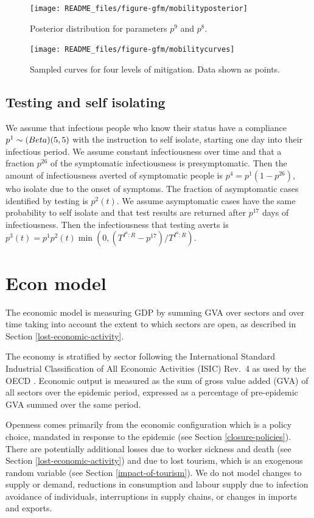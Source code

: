 \documentclass[
]{article}
\begin{document}
\begin{figure}
\texttt{[image: README\_files/figure-gfm/mobilityposterior]} \caption{Posterior distribution for parameters $p^9$ and $p^8$.}\label{fig:mobilityposterior}
\end{figure}

\begin{figure}
\texttt{[image: README\_files/figure-gfm/mobilitycurves]} \caption{Sampled curves for four levels of mitigation. Data shown as points.}\label{fig:mobilitycurves}
\end{figure}

\subsection{Testing and self isolating}\label{testing-and-self-isolating}

We assume that infectious people who know their status have a compliance \(p^1\sim\text(Beta)(5,5)\) with the instruction to self isolate, starting one day into their infectious period. We assume constant infectiousness over time and that a fraction \(p^{26}\) of the symptomatic infectiousness is presymptomatic. Then the amount of infectiousness averted of symptomatic people is \(p^4=p^1(1-p^{26})\), who isolate due to the onset of symptoms. The fraction of asymptomatic cases identified by testing is \(p^2(t)\). We assume asymptomatic cases have the same probability to self isolate and that test results are returned after \(p^{17}\) days of infectiousness. Then the infectiousness that testing averts is \(p^3(t)=p^1p^2(t)\min(0,(T^{I^a:R}-p^{17})/T^{I^a:R})\).

\section{Econ model}\label{econ-model}

The economic model is measuring GDP by summing GVA over sectors and over time taking into account the extent to which sectors are open, as described in Section \ref{lost-economic-activity}.

The economy is stratified by sector following the International Standard Industrial Classification of All Economic Activities (ISIC) Rev.~4 as used by the OECD \citep{un}. Economic output is measured as the sum of gross value added (GVA) of all sectors over the epidemic period, expressed as a percentage of pre-epidemic GVA summed over the same period.

Openness comes primarily from the economic configuration which is a policy choice, mandated in response to the epidemic (see Section \ref{closure-policies}). There are potentially additional losses due to worker sickness and death (see Section \ref{lost-economic-activity}) and due to lost tourism, which is an exogenous random variable (see Section \ref{impact-of-tourism}). We do not model changes to supply or demand, reductions in consumption and labour supply due to infection avoidance of individuals, interruptions in supply chains, or changes in imports and exports.
\end{document}
